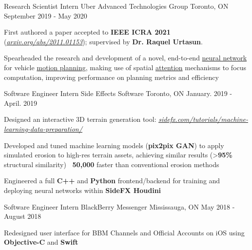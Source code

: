 \begin{cventries}
  \cventry
    {Research Scientist Intern} %
    {Uber Advanced Technologies Group} %
    {Toronto, ON} %
    {September 2019 - May 2020} %
    {
      \begin{cvitems} %
        \item {First authored a paper accepted to \textbf{IEEE ICRA 2021}} (\href{https://arxiv.org/pdf/2011.01153.pdf}{\underline{\textit{arxiv.org/abs/2011.01153}}});
        supervised by \textbf{Dr. Raquel Urtasun}.
        \item {Spearheaded the research and development of a novel, end-to-end
        \underline{neural network} for vehicle \underline{motion planning}, making use of
        spatial \underline{attention} mechanisms to focus computation, improving performance
        on planning metrics and efficiency}
      \end{cvitems}
    }

  \cventry
    {Software Engineer Intern} %
    {Side Effects Software} %
    {Toronto, ON} %
    {January. 2019 - April. 2019} %
    {
      \begin{cvitems} %
        \item {Designed an interactive 3D terrain generation tool: \href{https://www.sidefx.com/tutorials/machine-learning-data-preparation/}{\underline{\textit{sidefx.com/tutorials/machine-learning-data-preparation/}}}}
        \item {Developed and tuned machine learning models (\textbf{pix2pix GAN}) to
        apply simulated erosion to high-res terrain assets, achieving similar
        results (>\textbf{95\%} structural similarity) \textbf{~50,000\times} faster than conventional erosion methods}
        \item {Engineered a full \textbf{C++} and \textbf{Python} frontend/backend for training and deploying neural networks within \textbf{SideFX Houdini}}
      \end{cvitems}
    }

  \cventry
    {Software Engineer Intern} %
    {BlackBerry Messenger} %
    {Mississauga, ON} %
    {May 2018 - August 2018} %
    {
      \begin{cvitems} %
        \item {Redesigned user interface for BBM Channels and Official Accounts on iOS using \textbf{Objective-C} and \textbf{Swift}}
      \end{cvitems}
    }

\end{cventries}
